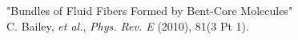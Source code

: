 "Bundles of Fluid Fibers Formed by Bent-Core Molecules" \\
\small{C. Bailey, \textit{et al.}, \textit{Phys. Rev. E} (2010), 81(3 Pt 1).} \\
